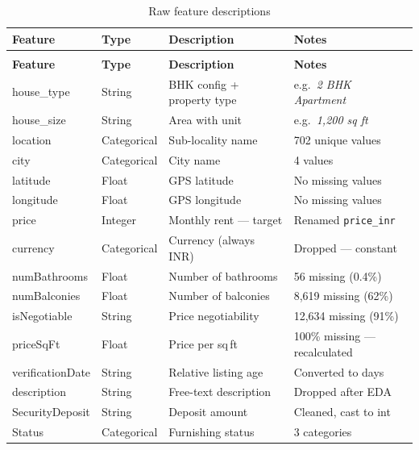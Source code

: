 \documentclass[12pt,a4paper]{article}
\newcommand{\TH}[1]{\cellcolor{TblHead}\color{white}\sffamily\bfseries\small #1}
\newcommand{\RA}{\cellcolor{RowA}}
\newcommand{\RB}{\cellcolor{RowB}}
\begin{document}
\begin{longtable}{>{\ttfamily\small}p{3.1cm} p{2.0cm} p{4.7cm} p{3.5cm}}
  \caption{Raw feature descriptions}\label{tab:feat}\\
  \toprule
  \TH{Feature} & \TH{Type} & \TH{Description} & \TH{Notes} \\
  \midrule\endfirsthead
  \multicolumn{4}{c}{\itshape\small(Table~\ref{tab:feat} continued)}\\
  \toprule\TH{Feature}&\TH{Type}&\TH{Description}&\TH{Notes}\\\midrule\endhead
  \RA house\_type      & String      & BHK config + property type & e.g.\ \textit{2 BHK Apartment} \\
  \RB house\_size      & String      & Area with unit             & e.g.\ \textit{1{,}200 sq ft}  \\
  \RA location         & Categorical & Sub-locality name          & 702 unique values             \\
  \RB city             & Categorical & City name                  & 4 values                      \\
  \RA latitude         & Float       & GPS latitude               & No missing values             \\
  \RB longitude        & Float       & GPS longitude              & No missing values             \\
  \RA price            & Integer     & Monthly rent --- target    & Renamed \texttt{price\_inr}   \\
  \RB currency         & Categorical & Currency (always INR)      & Dropped --- constant          \\
  \RA numBathrooms     & Float       & Number of bathrooms        & 56 missing (0.4\%)            \\
  \RB numBalconies     & Float       & Number of balconies        & 8{,}619 missing (62\%)        \\
  \RA isNegotiable     & String      & Price negotiability        & 12{,}634 missing (91\%)       \\
  \RB priceSqFt        & Float       & Price per sq\,ft           & 100\% missing --- recalculated\\
  \RA verificationDate & String      & Relative listing age       & Converted to days             \\
  \RB description      & String      & Free-text description      & Dropped after EDA             \\
  \RA SecurityDeposit  & String      & Deposit amount             & Cleaned, cast to int          \\
  \RB Status           & Categorical & Furnishing status          & 3 categories                  \\
  \bottomrule
\end{longtable}
\end{document}
